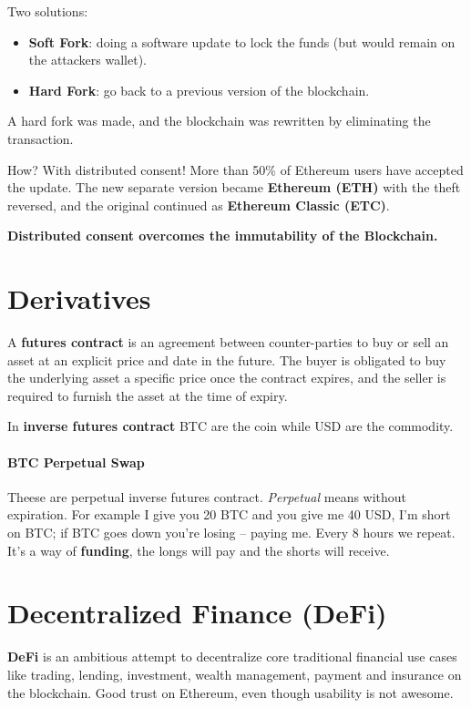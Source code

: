 Two solutions:
\begin{itemize}
    \item \textbf{Soft Fork}: doing a software update to lock the funds (but would remain on the attackers wallet).
    \item \textbf{Hard Fork}: go back to a previous version of the blockchain.
\end{itemize}

A hard fork was made, and the blockchain was rewritten by eliminating the transaction.

How? With distributed consent! More than 50\% of Ethereum users have accepted the update. The new separate version became \textbf{Ethereum (ETH)} with the theft reversed, and the original continued as \textbf{Ethereum Classic (ETC)}.

\textbf{Distributed consent overcomes the immutability of the Blockchain.}

\section{Derivatives}

A \textbf{futures contract} is an agreement between counter-parties to buy or sell an asset at an explicit price and date in the future. The buyer is obligated to buy the underlying asset a specific price once the contract expires, and the seller is required to furnish the asset at the time of expiry.

In \textbf{inverse futures contract} BTC are the coin while USD are the commodity.

\paragraph{BTC Perpetual Swap} Theese are perpetual inverse futures contract. \emph{Perpetual} means without expiration. For example I give you 20 BTC and you give me 40 USD, I'm short on BTC; if BTC goes down you're losing -- paying me. Every 8 hours we repeat. It's a way of \textbf{funding}, the longs will pay and the shorts will receive.

\section{Decentralized Finance (DeFi)}

\textbf{DeFi} is an ambitious attempt to decentralize core traditional financial use cases like trading, lending, investment, wealth management, payment and insurance on the blockchain. Good trust on Ethereum, even though usability is not awesome.

